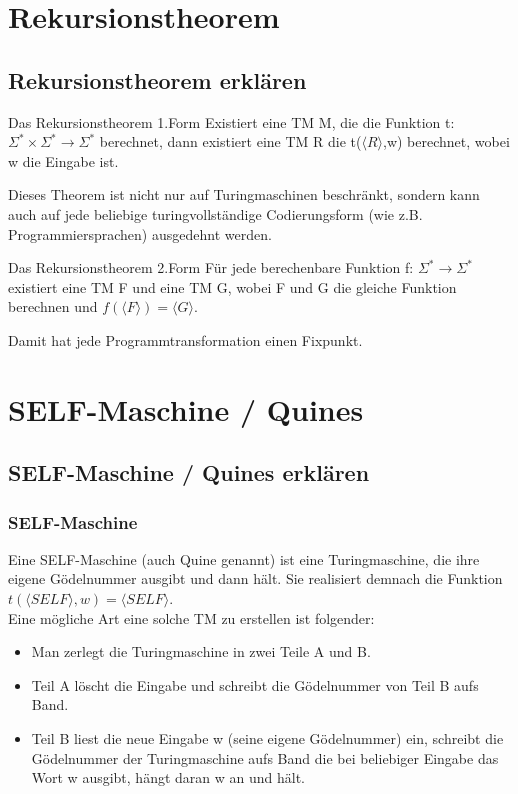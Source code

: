 



\section{Rekursionstheorem}
\subsection{Rekursionstheorem erklären}
\begin{frame}
\begin{block}{Das Rekursionstheorem 1.Form}
Existiert eine TM M, die die Funktion t:$\Sigma^*\times \Sigma^*\rightarrow\Sigma^*$ berechnet, dann existiert eine TM R die t($\langle R\rangle$,w) berechnet, wobei w die Eingabe ist.
\end{block}
Dieses Theorem ist nicht nur auf Turingmaschinen beschränkt, sondern kann auch auf jede beliebige turingvollständige Codierungsform (wie z.B. Programmiersprachen) ausgedehnt werden.
\begin{block}{Das Rekursionstheorem 2.Form}
Für jede berechenbare Funktion f: $\Sigma^*\rightarrow\Sigma^*$ existiert eine TM F und eine TM G, wobei F und G die gleiche Funktion berechnen und $f(\langle F\rangle)=\langle G\rangle$.\\
\end{block}
Damit hat jede Programmtransformation einen Fixpunkt.
\end{frame}

\section{SELF-Maschine / Quines}
\subsection{SELF-Maschine / Quines erklären}
\begin{frame}
\frametitle{SELF-Maschine}
Eine SELF-Maschine (auch Quine genannt) ist eine Turingmaschine, die ihre eigene Gödelnummer ausgibt und dann hält. Sie realisiert demnach die Funktion $t(\langle SELF\rangle,w)=\langle SELF\rangle$.\\
Eine mögliche Art eine solche TM zu erstellen ist folgender:
\begin{itemize}
\item Man zerlegt die Turingmaschine in zwei Teile A und B.
\item Teil A löscht die Eingabe und schreibt die Gödelnummer von Teil B aufs Band.
\item Teil B liest die neue Eingabe w (seine eigene Gödelnummer) ein, schreibt die Gödelnummer der Turingmaschine aufs Band die bei beliebiger Eingabe das Wort w ausgibt, hängt daran w an und hält.
\end{itemize}
\end{frame}


